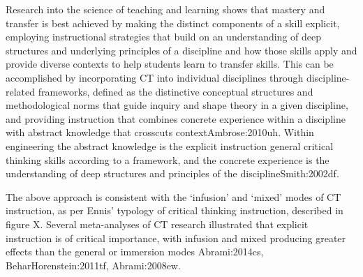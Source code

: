 Research into the science of teaching and learning shows that mastery and transfer is best achieved by making the distinct components of a skill explicit, employing instructional strategies that build on an understanding of deep structures and underlying principles of a discipline and how those skills apply and provide diverse contexts to help students learn to transfer skills. This can be accomplished by incorporating CT into individual disciplines through discipline-related frameworks, defined as the distinctive conceptual structures and methodological norms that guide inquiry and shape theory in a given discipline, and providing instruction that combines concrete experience within a discipline with abstract knowledge that crosscuts context{Ambrose:2010uh}. Within engineering the abstract knowledge is the explicit instruction general critical thinking skills according to a framework, and the concrete experience is the understanding of deep structures and principles of the discipline{Smith:2002df}.  

The above approach is consistent with the ‘infusion’ and ‘mixed’ modes of CT instruction, as per Ennis’ typology of critical thinking instruction, described in figure X.  Several meta-analyses of CT research illustrated that explicit instruction is of critical importance, with infusion and mixed producing greater effects than the general or immersion modes {Abrami:2014cs, BeharHorenstein:2011tf, Abrami:2008ew}.  
